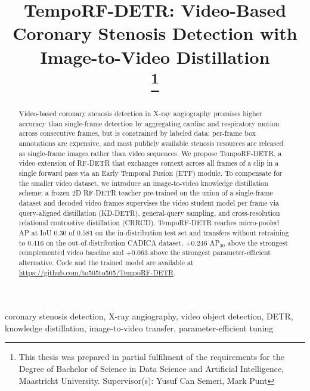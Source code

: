 \documentclass[conference]{IEEEtran}
\begin{document}
\title{TempoRF-DETR: Video-Based Coronary Stenosis Detection with Image-to-Video Distillation\\
\thanks{This thesis was prepared in partial fulfilment of the requirements for the Degree of Bachelor of Science in Data Science and Artificial Intelligence, Maastricht University. Supervisor(s): Yusuf Can Semeri, Mark Punt}
}

\author{
}

\maketitle

\begin{abstract}
Video-based coronary stenosis detection in X-ray angiography promises higher accuracy than single-frame detection by aggregating cardiac and respiratory motion across consecutive frames, but is constrained by labeled data: per-frame box annotations are expensive, and most publicly available stenosis resources are released as single-frame images rather than video sequences. We propose TempoRF-DETR, a video extension of RF-DETR that exchanges context across all frames of a clip in a single forward pass via an Early Temporal Fusion (ETF) module. To compensate for the smaller video dataset, we introduce an image-to-video knowledge distillation scheme: a frozen 2D RF-DETR teacher pre-trained on the union of a single-frame dataset and decoded video frames supervises the video student model per frame via query-aligned distillation (KD-DETR), general-query sampling, and cross-resolution relational contrastive distillation (CRRCD). TempoRF-DETR reaches micro-pooled AP at IoU 0.30 of $0.581$ on the in-distribution test set and transfers without retraining to $0.416$ on the out-of-distribution CADICA dataset, $+0.246$ AP$_{30}$ above the strongest reimplemented video baseline and $+0.063$ above the strongest parameter-efficient alternative. Code and the trained model are available at \url{https://github.com/to505to505/TempoRF-DETR}.
\end{abstract}

\begin{IEEEkeywords}
coronary stenosis detection, X-ray angiography, video object detection, DETR, knowledge distillation, image-to-video transfer, parameter-efficient tuning
\end{IEEEkeywords}
\end{document}
